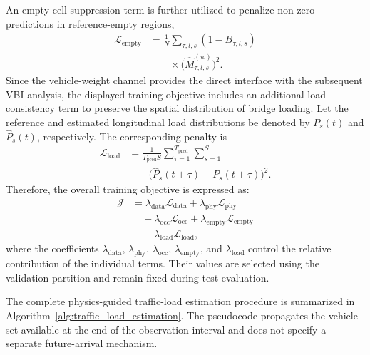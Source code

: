 \documentclass[journal]{IEEEtran}
\begin{document}
An empty-cell suppression term is further utilized to penalize non-zero predictions in reference-empty regions,
\begin{equation}
\begin{aligned}
\mathcal{L}_{\mathrm{empty}}&=\frac{1}{N}\sum_{\tau,l,s}(1-B_{\tau,l,s})\\
&\qquad\times\bigl(\widehat{M}_{\tau,l,s}^{(w)}\bigr)^2.
\end{aligned}
\end{equation}
Since the vehicle-weight channel provides the direct interface with the subsequent VBI analysis, the displayed training objective includes an additional load-consistency term to preserve the spatial distribution of bridge loading. Let the reference and estimated longitudinal load distributions be denoted by $P_s(t)$ and $\widehat{P}_s(t)$, respectively. The corresponding penalty is
\begin{equation}
\begin{aligned}
\mathcal{L}_{\mathrm{load}}&=\frac{1}{T_{\mathrm{pred}}S}\sum_{\tau=1}^{T_{\mathrm{pred}}}\sum_{s=1}^{S}\\
&\qquad\bigl(\widehat{P}_{s}(t+\tau)-P_s(t+\tau)\bigr)^2.
\end{aligned}
\end{equation}
Therefore, the overall training objective is expressed as:
\begin{equation}
\begin{aligned}
\mathcal{J}&=\lambda_{\mathrm{data}}\mathcal{L}_{\mathrm{data}}+\lambda_{\mathrm{phy}}\mathcal{L}_{\mathrm{phy}}\\
&\quad+\lambda_{\mathrm{occ}}\mathcal{L}_{\mathrm{occ}}+\lambda_{\mathrm{empty}}\mathcal{L}_{\mathrm{empty}}\\
&\quad+\lambda_{\mathrm{load}}\mathcal{L}_{\mathrm{load}},
\end{aligned}
\end{equation}
where the coefficients $\lambda_{\mathrm{data}}$, $\lambda_{\mathrm{phy}}$, $\lambda_{\mathrm{occ}}$, $\lambda_{\mathrm{empty}}$, and $\lambda_{\mathrm{load}}$ control the relative contribution of the individual terms. Their values are selected using the validation partition and remain fixed during test evaluation.

The complete physics-guided traffic-load estimation procedure is summarized in Algorithm~\ref{alg:traffic_load_estimation}. The pseudocode propagates the vehicle set available at the end of the observation interval and does not specify a separate future-arrival mechanism.
\end{document}
